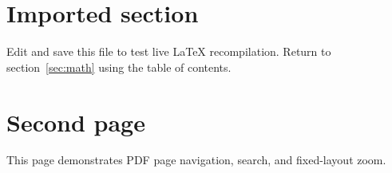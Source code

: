 \section{Imported section}
Edit and save this file to test live LaTeX recompilation. Return to section~\ref{sec:math} using the table of contents.

\newpage
\section{Second page}
This page demonstrates PDF page navigation, search, and fixed-layout zoom.
